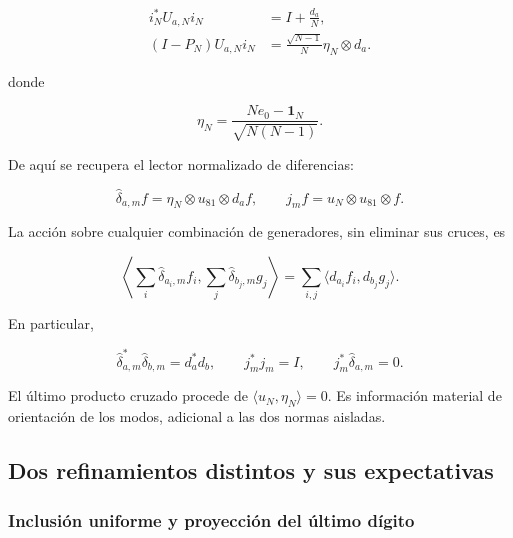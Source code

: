 \begin{equation}
\begin{aligned}
i_N^*U_{a,N}i_N&=I+\frac{d_a}{N},\\
(I-P_N)U_{a,N}i_N
&=\frac{\sqrt{N-1}}{N}\eta_N\otimes d_a.
\end{aligned}
\label{viii:gamma-add-display-3}
\end{equation}

donde

\begin{equation}
\eta_N=\frac{Ne_0-\mathbf1_N}{\sqrt{N(N-1)}}.
\label{viii:gamma-add-display-4}
\end{equation}

De aquí se recupera el lector normalizado de diferencias:

\begin{equation}
\widehat\delta_{a,m}f=\eta_N\otimes u_{81}\otimes d_af,
\qquad
j_mf=u_N\otimes u_{81}\otimes f.
\label{viii:gamma-add-display-5}
\end{equation}

La acción sobre cualquier combinación de generadores, sin eliminar sus cruces, es

\begin{equation}
\left\langle\sum_i\widehat\delta_{a_i,m}f_i,
                  \sum_j\widehat\delta_{b_j,m}g_j\right\rangle
=\sum_{i,j}\langle d_{a_i}f_i,d_{b_j}g_j\rangle.
\label{viii:gamma-add-display-6}
\end{equation}

En particular,

\begin{equation}
\widehat\delta_{a,m}^*\widehat\delta_{b,m}=d_a^*d_b,\qquad
j_m^*j_m=I,\qquad
j_m^*\widehat\delta_{a,m}=0.
\label{viii:gamma-add-eq-1}
\end{equation}

El último producto cruzado procede de \(\langle u_N,\eta_N\rangle=0\). Es información material de orientación de los modos, adicional a las dos normas aisladas.

\subsection{Dos refinamientos distintos y sus expectativas}
\label{viii:gamma-add-sub-108}

\subsubsection{Inclusión uniforme y proyección del último dígito}
\label{viii:gamma-add-sub-110}

